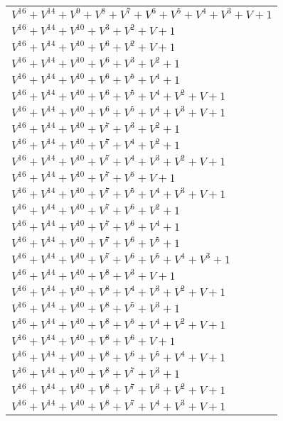 \documentclass[12pt]{article}
\begin{document}
\begin{adjustwidth}{-4cm}{}
\begin{center}
\begin{longtable}{|l|}
$V^{16}  +V^{14}  +V^{9}  +V^{8}  +V^{7}  +V^{6}  +V^{5}  +V^{4}  +V^{3}  + V + 1$ \\
$V^{16}  +V^{14}  +V^{10}  +V^{3}  +V^{2}  + V + 1$ \\
$V^{16}  +V^{14}  +V^{10}  +V^{6}  +V^{2}  + V + 1$ \\
$V^{16}  +V^{14}  +V^{10}  +V^{6}  +V^{3}  +V^{2}  + 1$ \\
$V^{16}  +V^{14}  +V^{10}  +V^{6}  +V^{5}  +V^{4}  + 1$ \\
$V^{16}  +V^{14}  +V^{10}  +V^{6}  +V^{5}  +V^{4}  +V^{2}  + V + 1$ \\
$V^{16}  +V^{14}  +V^{10}  +V^{6}  +V^{5}  +V^{4}  +V^{3}  + V + 1$ \\
$V^{16}  +V^{14}  +V^{10}  +V^{7}  +V^{3}  +V^{2}  + 1$ \\
$V^{16}  +V^{14}  +V^{10}  +V^{7}  +V^{4}  +V^{2}  + 1$ \\
$V^{16}  +V^{14}  +V^{10}  +V^{7}  +V^{4}  +V^{3}  +V^{2}  + V + 1$ \\
$V^{16}  +V^{14}  +V^{10}  +V^{7}  +V^{5}  + V + 1$ \\
$V^{16}  +V^{14}  +V^{10}  +V^{7}  +V^{5}  +V^{4}  +V^{3}  + V + 1$ \\
$V^{16}  +V^{14}  +V^{10}  +V^{7}  +V^{6}  +V^{2}  + 1$ \\
$V^{16}  +V^{14}  +V^{10}  +V^{7}  +V^{6}  +V^{4}  + 1$ \\
$V^{16}  +V^{14}  +V^{10}  +V^{7}  +V^{6}  +V^{5}  + 1$ \\
$V^{16}  +V^{14}  +V^{10}  +V^{7}  +V^{6}  +V^{5}  +V^{4}  +V^{3}  + 1$ \\
$V^{16}  +V^{14}  +V^{10}  +V^{8}  +V^{3}  + V + 1$ \\
$V^{16}  +V^{14}  +V^{10}  +V^{8}  +V^{4}  +V^{3}  +V^{2}  + V + 1$ \\
$V^{16}  +V^{14}  +V^{10}  +V^{8}  +V^{5}  +V^{3}  + 1$ \\
$V^{16}  +V^{14}  +V^{10}  +V^{8}  +V^{5}  +V^{4}  +V^{2}  + V + 1$ \\
$V^{16}  +V^{14}  +V^{10}  +V^{8}  +V^{6}  + V + 1$ \\
$V^{16}  +V^{14}  +V^{10}  +V^{8}  +V^{6}  +V^{5}  +V^{4}  + V + 1$ \\
$V^{16}  +V^{14}  +V^{10}  +V^{8}  +V^{7}  +V^{3}  + 1$ \\
$V^{16}  +V^{14}  +V^{10}  +V^{8}  +V^{7}  +V^{3}  +V^{2}  + V + 1$ \\
$V^{16}  +V^{14}  +V^{10}  +V^{8}  +V^{7}  +V^{4}  +V^{3}  + V + 1$ \\

\end{longtable}
\end{center}
\end{adjustwidth}
\end{document}
